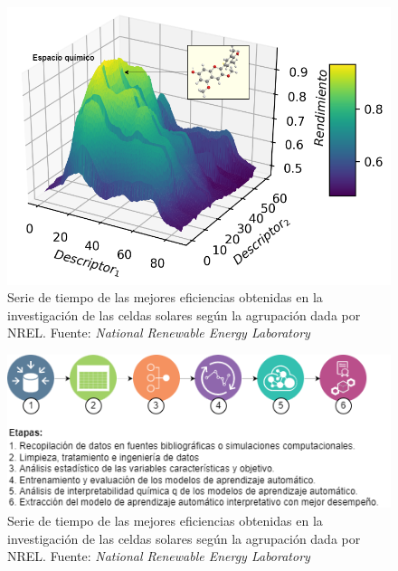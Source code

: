 \begin{figure}[h!]
    \begin{center}
        \includegraphics[scale=0.45]{img/espacioquimico.png}
    \end{center}
    \label{img:espacioquimico}
    \caption{Serie de tiempo de las mejores eficiencias obtenidas en la investigación de las celdas solares según la agrupación dada por NREL.
    Fuente: \textit{National Renewable Energy Laboratory} \cite{owidenergy}}
\end{figure}

\begin{figure}[h!]
    \begin{center}
        \includegraphics[scale=0.7]{img/etapas.png}
    \end{center}
    \label{img:etapas}
    \caption{Serie de tiempo de las mejores eficiencias obtenidas en la investigación de las celdas solares según la agrupación dada por NREL.
    Fuente: \textit{National Renewable Energy Laboratory} \cite{owidenergy}}
\end{figure}